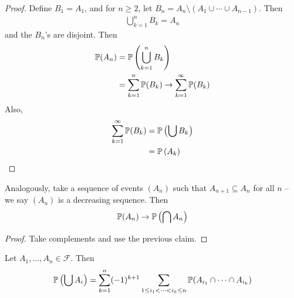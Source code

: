 \documentclass{../../template/note}
\begin{document}
    \begin{proof}
        Define \(B_1 = A_1\), and for \(n \geq 2\), let \(B_n = A_n \setminus (A_1 \cup \cdots \cup A_{n-1})\). Then
        \begin{align*}
            \bigcup_{k=1}^n B_k = A_n
        \end{align*}
        and the \(B_n\)'s are disjoint. Then
        \begin{align*}
            \mathbb P(A_n) &= \mathbb P\left(\bigcup_{k=1}^n B_k\right) \\
            &= \sum_{k=1}^n \mathbb P(B_k) \to \sum_{k=1}^\infty \mathbb P(B_k)
        \end{align*}
        Also,
        \begin{align*}
            \sum_{k=1}^\infty \mathbb P(B_k) &= \mathbb P\left(\bigcup B_k\right) \\
            &= \mathbb P\left(A_k\right)
        \end{align*}
    \end{proof}
    
    \begin{corollary}
        Analogously, take a sequence of events \((A_n)\) such that \(A_{n+1} \subseteq A_n\) for all \(n\) -- we say \((A_n)\) is a decreasing sequence. Then
        \begin{align*}
            \mathbb P(A_n) \to \mathbb P\left(\bigcap A_n\right)
        \end{align*}
    \end{corollary}
    
    \begin{proof}
        Take complements and use the previous claim.
    \end{proof}
    
    \begin{proposition}
        Let \(A_1, \dots, A_n \in \mathcal F\). Then
        \begin{align*}
            \mathbb P\left(\bigcup A_i\right) = \sum_{k=1}^n (-1)^{k+1} \sum_{1 \leq i_1 < \dots < i_k \leq n} \mathbb P(A_{i_1} \cap \cdots \cap A_{i_k})
        \end{align*}
    \end{proposition}
    
\end{document}
